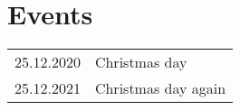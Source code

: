 \chapter{Events}
\thispagestyle{emptycomplete}
\begin{tabularx}{\textwidth}{r |@{\linedbullet} X}
    25.12.2020 & Christmas day \\
    25.12.2021 & Christmas day again \\
\end{tabularx}
\newpage

